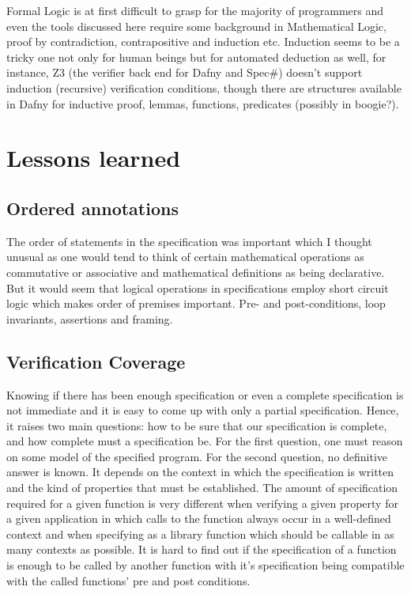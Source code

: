 \documentclass[10pt]{article} %
\begin{document}
Formal Logic is at first difficult to grasp for the majority of programmers and even the tools discussed here require some background in Mathematical Logic, proof by contradiction, contrapositive and induction etc. Induction seems to be a tricky one not only for human beings but for automated deduction as well, for instance, Z3 (the verifier back end for Dafny and Spec\#) doesn't support induction (recursive) verification conditions, though there are structures available in Dafny for inductive proof, lemmas, functions, predicates (possibly in boogie?).

\section{Lessons learned}

\subsection{Ordered annotations}
The order of statements in the specification was important which I thought unusual as one would tend to think of certain  mathematical operations as commutative or associative and mathematical definitions as being declarative. But it would seem that logical operations in specifications employ short circuit logic which makes order of premises important. Pre- and post-conditions, loop invariants, assertions and framing.

\subsection{Verification Coverage}
Knowing if there has been enough specification or even a complete specification is not immediate and it is easy to come up with only a partial specification. Hence, it raises two main questions: how to be sure that our specification is complete, and how complete must a specification be. For the first question, one must reason on some model of the specified program. For the second question, no definitive answer is known. It depends on the context in which the specification is written and the kind of properties that must be established. The amount of specification required for a given function is very different when verifying a given property for a given application in which calls to the function always occur in a well-defined context and when specifying as a library function which should be callable in as many contexts as possible. It is hard to find out if the specification of a function is enough to be called by another function with it's specification being compatible with the called functions' pre and post conditions.
\end{document}
